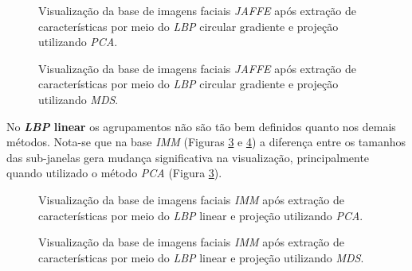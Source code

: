 \documentclass[conference]{IEEEtran}
\begin{document}
\begin{figure}[h]
\center
\leavevmode
{}
\qquad
{}
\caption{Visualização da base de imagens faciais \textit{JAFFE} após extração de características por meio do \textit{LBP} circular gradiente e projeção utilizando \textit{PCA}.}
 \label{fig_lbp_result_circular_gradiente_jaffe_pca}
\end{figure}

\begin{figure}[h]
\center
\leavevmode
{}
\qquad
{}
\caption{Visualização da base de imagens faciais \textit{JAFFE} após extração de características por meio do \textit{LBP} circular gradiente e projeção utilizando \textit{MDS}.}
 \label{fig_lbp_result_circular_gradiente_jaffe}
\end{figure}

No \textbf{\textit{LBP} linear} os agrupamentos não são tão bem definidos quanto nos demais métodos. Nota-se que na base \textit{IMM} (Figuras \ref{fig_lbp_result_linear_imm_pca} e \ref{fig_lbp_result_linear_imm}) a diferença entre os tamanhos das sub-janelas gera mudança significativa na visualização, principalmente quando utilizado o método \textit{PCA} (Figura \ref{fig_lbp_result_linear_imm_pca}). 

\begin{figure}[h]
\center
\leavevmode
{}
\qquad
{}
\caption{Visualização da base de imagens faciais \textit{IMM} após extração de características por meio do \textit{LBP} linear e projeção utilizando \textit{PCA}.}
 \label{fig_lbp_result_linear_imm_pca}
\end{figure}

\begin{figure}[h]
\center
\leavevmode
{}
\qquad
{}
\caption{Visualização da base de imagens faciais \textit{IMM} após extração de características por meio do \textit{LBP} linear e projeção utilizando \textit{MDS}.}
 \label{fig_lbp_result_linear_imm}
\end{figure}
\end{document}
